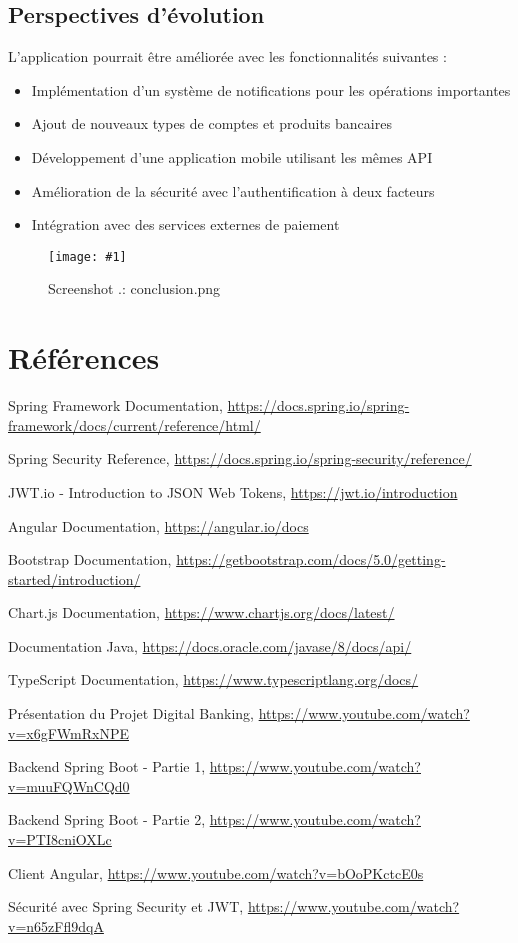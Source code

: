 \documentclass[12pt,a4paper]{report}
\newcounter{screenshotcounter}[chapter]
\newcommand{\screenshot}[2]{
  \stepcounter{screenshotcounter}
  \begin{figure}[H]
    \centering
    \texttt{[image: \#1]}
    \caption{Screenshot \thechapter.\thescreenshotcounter: #1}
    \label{fig:#1}
  \end{figure}
}
\begin{document}
\section{Perspectives d'évolution}
L'application pourrait être améliorée avec les fonctionnalités suivantes :
\begin{itemize}
    \item Implémentation d'un système de notifications pour les opérations importantes
    \item Ajout de nouveaux types de comptes et produits bancaires
    \item Développement d'une application mobile utilisant les mêmes API
    \item Amélioration de la sécurité avec l'authentification à deux facteurs
    \item Intégration avec des services externes de paiement
\end{itemize}

\screenshot{conclusion.png}{0.8} %

\chapter*{Références}

\begin{thebibliography}{9}

Spring Framework Documentation,
\url{https://docs.spring.io/spring-framework/docs/current/reference/html/}

Spring Security Reference,
\url{https://docs.spring.io/spring-security/reference/}

JWT.io - Introduction to JSON Web Tokens,
\url{https://jwt.io/introduction}

Angular Documentation,
\url{https://angular.io/docs}

Bootstrap Documentation,
\url{https://getbootstrap.com/docs/5.0/getting-started/introduction/}

Chart.js Documentation,
\url{https://www.chartjs.org/docs/latest/}

Documentation Java,
\url{https://docs.oracle.com/javase/8/docs/api/}

TypeScript Documentation,
\url{https://www.typescriptlang.org/docs/}

Présentation du Projet Digital Banking,
\url{https://www.youtube.com/watch?v=x6gFWmRxNPE}

Backend Spring Boot - Partie 1,
\url{https://www.youtube.com/watch?v=muuFQWnCQd0}

Backend Spring Boot - Partie 2,
\url{https://www.youtube.com/watch?v=PTI8cniOXLc}

Client Angular,
\url{https://www.youtube.com/watch?v=bOoPKctcE0s}

Sécurité avec Spring Security et JWT,
\url{https://www.youtube.com/watch?v=n65zFfl9dqA}

\end{thebibliography}
\end{document}
